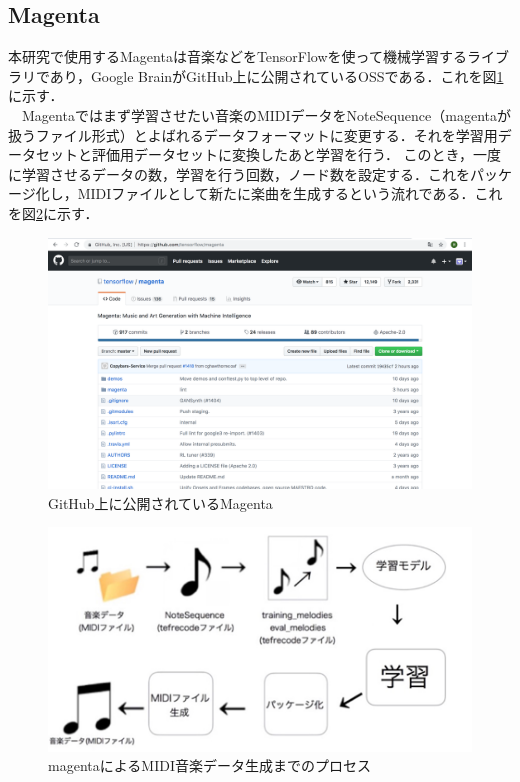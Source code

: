 \subsection{Magenta}
本研究で使用するMagentaは音楽などをTensorFlowを使って機械学習するライブラリであり，Google BrainがGitHub上に公開されているOSSである．これを図\ref{fig:GitHub上に公開されているMagenta}に示す．\\
　Magentaではまず学習させたい音楽のMIDIデータをNoteSequence（magentaが扱うファイル形式）とよばれるデータフォーマットに変更する．それを学習用データセットと評価用データセットに変換したあと学習を行う．
このとき，一度に学習させるデータの数，学習を行う回数，ノード数を設定する．これをパッケージ化し，MIDIファイルとして新たに楽曲を生成するという流れである．これを図\ref{fig:magentaによるMIDI音楽データ生成までのプロセス}に示す．
\begin{figure}[h]
    \begin{screen}
    \begin{center}
        \includegraphics[scale=0.3, clip]{./img/magentagithub.png}
        \caption{GitHub上に公開されているMagenta}
        \label{fig:GitHub上に公開されているMagenta}
    \end{center}
    \end{screen}
\end{figure}
\newpage
\begin{figure}[h]
    \begin{screen}
    \begin{center}
        \includegraphics[scale=1.7, clip]{./img/magenta_usestep.png}
        \caption{magentaによるMIDI音楽データ生成までのプロセス}
        \label{fig:magentaによるMIDI音楽データ生成までのプロセス}
    \end{center}
    \end{screen}
\end{figure}
